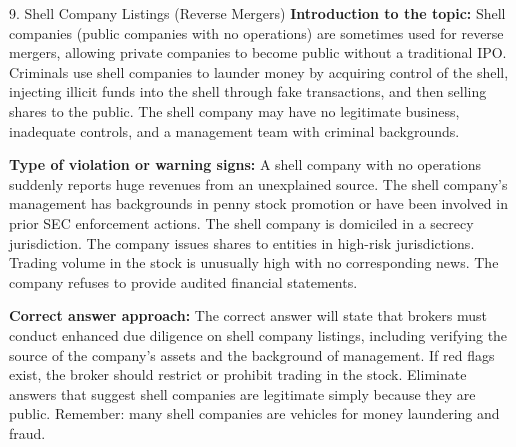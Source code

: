 \documentclass[11pt,a4paper]{beamer}
\begin{document}
\begin{frame}{9. Shell Company Listings (Reverse Mergers)}
\tiny
\noindent\textbf{Introduction to the topic:} Shell companies (public companies with no operations) are sometimes used for reverse mergers, allowing private companies to become public without a traditional IPO. Criminals use shell companies to launder money by acquiring control of the shell, injecting illicit funds into the shell through fake transactions, and then selling shares to the public. The shell company may have no legitimate business, inadequate controls, and a management team with criminal backgrounds.

\vspace{0.1cm}
\noindent\textbf{Type of violation or warning signs:} A shell company with no operations suddenly reports huge revenues from an unexplained source. The shell company's management has backgrounds in penny stock promotion or have been involved in prior SEC enforcement actions. The shell company is domiciled in a secrecy jurisdiction. The company issues shares to entities in high-risk jurisdictions. Trading volume in the stock is unusually high with no corresponding news. The company refuses to provide audited financial statements.

\vspace{0.1cm}
\noindent\textbf{Correct answer approach:} The correct answer will state that brokers must conduct enhanced due diligence on shell company listings, including verifying the source of the company's assets and the background of management. If red flags exist, the broker should restrict or prohibit trading in the stock. Eliminate answers that suggest shell companies are legitimate simply because they are public. Remember: many shell companies are vehicles for money laundering and fraud.
\end{frame}
\end{document}
